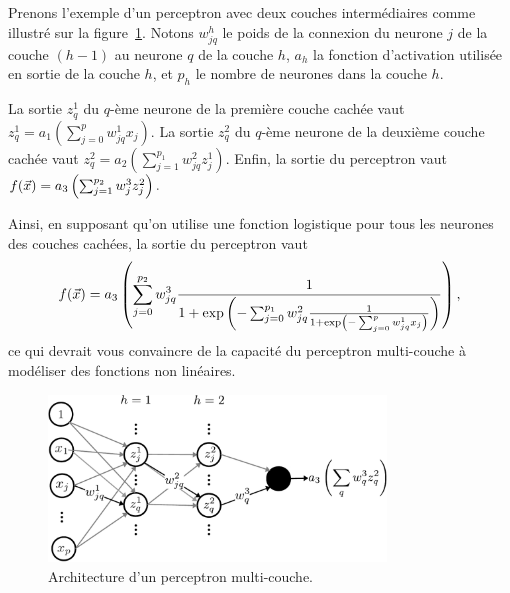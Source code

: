 \begin{exemple}
  Prenons l'exemple d'un perceptron avec deux couches intermédiaires comme
  illustré sur la figure~\ref{fig:mlp}. Notons $w^h_{jq}$ le poids de la
  connexion du neurone $j$ de la couche $(h-1)$ au neurone $q$ de la couche
  $h$, $a_h$ la fonction d'activation utilisée en sortie de la couche $h$,
  et $p_h$ le nombre de neurones dans la couche $h$.
  
  La sortie $z_q^1$ du $q$-ème neurone
  de la première couche cachée vaut
    $z_q^1 = a_1\left(\sum_{j=0}^p w_{jq}^1 x_j \right).$
  La sortie $z_q^2$ du $q$-ème neurone de la deuxième couche cachée vaut
    $z_q^2 = a_2\left(\sum_{j=1}^{p_1} w_{jq}^2 z_j^1 \right).$
  Enfin, la sortie du perceptron vaut
    $f(\xx) = a_3\left(\sum_{j=1}^{p_2} w_{j}^3 z_j^2 \right).$
  
  Ainsi, en supposant qu'on utilise une fonction logistique pour tous les
  neurones des couches cachées, la sortie du perceptron vaut 
  \begin{equation*}
    f(\xx) = a_3\left(\sum_{j=0}^{p_2} w_{jq}^3 \frac1{1 + 
        \exp\left(- \sum_{j=0}^{p_1} w_{jq}^2 \frac1{1 + 
            \exp\left(- \sum_{j=0}^p w_{jq}^1 x_j \right)} \right)} \right),
  \end{equation*}
  ce qui devrait vous convaincre de la capacité du perceptron multi-couche à
  modéliser des fonctions non linéaires.
\end{exemple}
  
\begin{figure}[h]
  \centering
  \includegraphics[width=0.8\textwidth]{figures/nonlin/mlp}
  \caption{Architecture d'un perceptron multi-couche. }
  \label{fig:mlp}
\end{figure}

